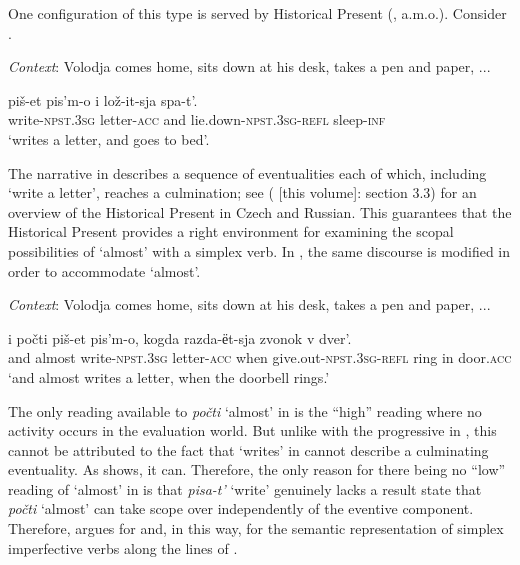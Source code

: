 \documentclass[output=paper,colorlinks,citecolor=brown]{langscibook}
\begin{document}
One configuration of this type is served by Historical Present (\citealt{Schlenker2004,Eckardt2015}, a.m.o.). Consider .

\eanoraggedright    \textit{Context}: Volodja comes home, sits down at his desk, takes a pen and paper, ...\label{tat:ex:42}

\gll piš-et  pis’m-o  i  lož-it-sja  spa-t’.  \\
    write-\textsc{npst.3sg}  letter-\textsc{acc}  and  lie.down-\textsc{npst.3sg-refl}  sleep-\textsc{inf}\\
\glt  ‘writes a letter, and goes to bed’.
\z

\noindent The narrative in  describes a sequence of eventualities each of which, including ‘write a letter’, reaches a culmination; see \citeauthor{chapters/05_gehrke} (\citeyear{chapters/05_gehrke} [this volume]: section 3.3) for an overview of the Historical Present in Czech and Russian. This guarantees that the Historical Present provides a right environment for examining the scopal possibilities of ‘almost’ with a simplex verb. In , the same discourse is modified in order to accommodate ‘almost’. 

\eanoraggedright    \textit{Context}: Volodja comes home, sits down at his desk, takes a pen and paper, ...\label{tat:ex:43}

\gll  i  počti  piš-et  pis’m-o,  kogda razda-ёt-sja   zvonok  v  dver'.\\
  and  almost  write-\textsc{npst.3sg}  letter-\textsc{acc}  when give.out-\textsc{npst.3sg-refl}   ring  in  door.\textsc{acc}\\


\glt ‘and almost writes a letter, when the doorbell rings.’
\z

\noindent The only reading available to \textit{počti} ‘almost’ in  is the “high” reading where no activity occurs in the evaluation world. But unlike with the progressive in , this cannot be attributed to the fact that ‘writes’ in  cannot describe a culminating eventuality. As  shows, it can. Therefore, the only reason for there being no “low” reading of ‘almost’ in  is that \textit{pisa-t’} ‘write’ genuinely lacks a result state that \textit{počti} ‘almost’ can take scope over independently of the eventive component. Therefore,  argues for  and, in this way, for the semantic representation of simplex imperfective verbs along the lines of .
\end{document}
